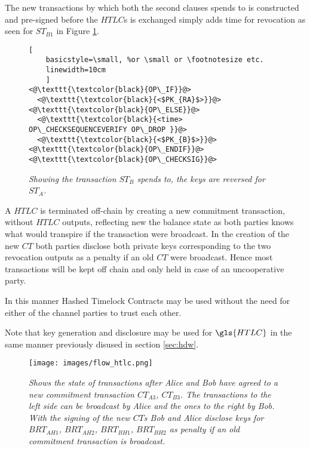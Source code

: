 The new transactions by which both the second clauses spends to is constructed and pre-signed before the $HTLC$s is exchanged simply adds time for revocation as seen for $ST_{B1}$ in Figure \ref{fig:timeout:tx}.

\begin{figure}[hbt!]
	
	\centering
	
	\begin{lstlisting}[
	basicstyle=\small, %or \small or \footnotesize etc.
	linewidth=10cm
	]
<@\texttt{\textcolor{black}{OP\_IF}}@>
  <@\texttt{\textcolor{black}{<$PK_{RA}$>}}@>
<@\texttt{\textcolor{black}{OP\_ELSE}}@>
  <@\texttt{\textcolor{black}{<time> OP\_CHECKSEQUENCEVERIFY OP\_DROP }}@>
  <@\texttt{\textcolor{black}{<$PK_{B}$>}}@>
<@\texttt{\textcolor{black}{OP\_ENDIF}}@>
<@\texttt{\textcolor{black}{OP\_CHECKSIG}}@>
	\end{lstlisting}
	
	\caption{\textit{ Showing the transaction $ST_{B}$ spends to, the keys are reversed for $ST_{A}$.
	}}
	\label{fig:timeout:tx}
\end{figure}

A $HTLC$ is terminated off-chain by creating a new commitment transaction, without $HTLC$ outputs, reflecting new the balance state as both parties knows what would transpire if the transaction were broadcast. In the creation of the new $CT$ both parties disclose both private keys corresponding to the two revocation outputs as a penalty if an old $CT$ were broadcast. Hence most transactions will be kept off chain and only held in case of an uncooperative party.

In this manner Hashed Timelock Contracts may be used without the need for either of the channel parties to trust each other.

Note that key generation and disclosure may be used for $\gls{HTLC}$ in the same manner previously disused in section \ref{sec:hdw}.

\newpage
\onecolumn

\begin{figure}[!htb]

	\centering
	\texttt{[image: images/flow\_htlc.png]}

	\caption{\textit{
			Shows the state of transactions after Alice and Bob have agreed to a new \gls{commitment transaction} $CT_{A3}$, $CT_{B3}$. 
			The transactions to the left side can be broadcast by Alice and the ones to the right by Bob. With the signing of the new $CT$s
			Bob and Alice disclose keys for $BRT_{AH1}$, $BRT_{AH2}$, $BRT_{BH1}$, $BRT_{BH2}$ as penalty if an old commitment transaction is broadcast.
		}}
\end{figure}
\newpage
\twocolumn

